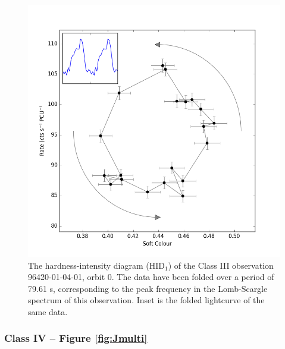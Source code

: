 \begin{figure}
    \includegraphics[width=\columnwidth, trim = 0mm 0mm 0mm 0mm]{images/Gloop.png}
    \captionsetup{singlelinecheck=off}
    \caption[A hardness-intensity diagram of the Class III observation 96420-01-04-01.]{The hardness-intensity diagram (HID$_1$) of the Class III observation 96420-01-04-01, orbit 0.  The data have been folded over a period of 79.61 s, corresponding to the peak frequency in the Lomb-Scargle spectrum of this observation.  Inset is the folded lightcurve of the same data.}
   \label{fig:LoopIII}
\end{figure}

\subsubsection{Class IV -- Figure \ref{fig:Jmulti}}
\label{sec:classIV}

